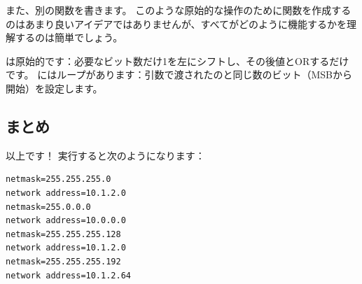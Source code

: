 また、別の関数を書きます。
このような原始的な操作のために関数を作成するのはあまり良いアイデアではありませんが、すべてがどのように機能するかを理解するのは簡単でしょう。



は原始的です：必要なビット数だけ1を左にシフトし、その後値とORするだけです。
にはループがあります：引数で渡されたのと同じ数のビット（\ac{MSB}から開始）を設定します。

\subsection{まとめ}

以上です！
実行すると次のようになります：

\begin{lstlisting}
netmask=255.255.255.0
network address=10.1.2.0
netmask=255.0.0.0
network address=10.0.0.0
netmask=255.255.255.128
network address=10.1.2.0
netmask=255.255.255.192
network address=10.1.2.64
\end{lstlisting}